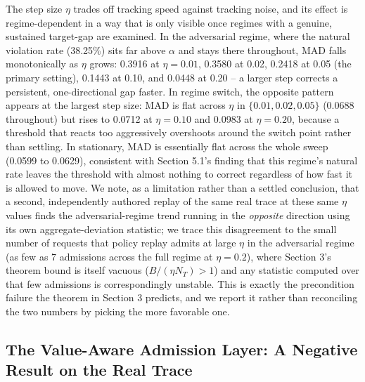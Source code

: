 \documentclass[11pt,letterpaper]{article}
\begin{document}
The step size $\eta$ trades off tracking speed against tracking noise, and its effect is regime-dependent in a way that is only visible once regimes with a genuine, sustained target-gap are examined. In the adversarial regime, where the natural violation rate (38.25\%) sits far above $\alpha$ and stays there throughout, MAD falls monotonically as $\eta$ grows: 0.3916 at $\eta = 0.01$, 0.3580 at 0.02, 0.2418 at 0.05 (the primary setting), 0.1443 at 0.10, and 0.0448 at 0.20 -- a larger step corrects a persistent, one-directional gap faster. In regime switch, the opposite pattern appears at the largest step size: MAD is flat across $\eta$ in $\{0.01, 0.02, 0.05\}$ (0.0688 throughout) but rises to 0.0712 at $\eta = 0.10$ and 0.0983 at $\eta = 0.20$, because a threshold that reacts too aggressively overshoots around the switch point rather than settling. In stationary, MAD is essentially flat across the whole sweep (0.0599 to 0.0629), consistent with Section 5.1's finding that this regime's natural rate leaves the threshold with almost nothing to correct regardless of how fast it is allowed to move. We note, as a limitation rather than a settled conclusion, that a second, independently authored replay of the same real trace at these same $\eta$ values finds the adversarial-regime trend running in the \textit{opposite} direction using its own aggregate-deviation statistic; we trace this disagreement to the small number of requests that policy replay admits at large $\eta$ in the adversarial regime (as few as 7 admissions across the full regime at $\eta = 0.2$), where Section 3's theorem bound is itself vacuous ($B/(\eta N_T) > 1$) and any statistic computed over that few admissions is correspondingly unstable. This is exactly the precondition failure the theorem in Section 3 predicts, and we report it rather than reconciling the two numbers by picking the more favorable one.

\subsection{The Value-Aware Admission Layer: A Negative Result on the Real Trace}
\end{document}
